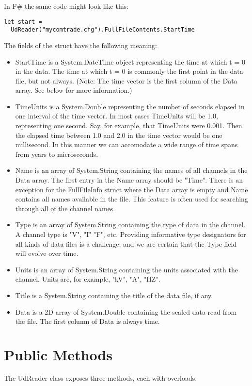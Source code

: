\documentclass[11pt,letterpaper,article]{memoir} %
\begin{document}
In F\# the same code might look like this:

\lstset{language=Caml}
\begin{lstlisting}
let start = 
  UdReader("mycomtrade.cfg").FullFileContents.StartTime
\end{lstlisting}

The fields of the struct have the following meaning:
\begin{itemize}
  \item StartTime is a System.DateTime object representing the time at which t = 0 in the data. The time at which t = 0 is commonly the first point in the data file, but not always. (Note: The time vector is the first column of the Data array. See below for more information.) 
  \item TimeUnits is a System.Double representing the number of seconds elapsed in one interval of the time vector. In most cases TimeUnits will be 1.0, representing one second. Say, for example, that TimeUnits were 0.001. Then the elapsed time between 1.0 and 2.0 in the time vector would be one millisecond. In this manner we can accomodate a wide range of time spans from years to microseconds.
  \item Name is an array of System.String containing the names of all channels in the Data array. The first entry in the Name array should be "Time". There is an exception for the FullFileInfo struct where the Data array is empty and Name contains all names available in the file. This feature is often used for searching through all of the channel names. 
  \item Type is an array of System.String containing the type of data in the channel. A channel type is "V", "I" "F", etc. Providing informative type designators for all kinds of data files is a challenge, and we are certain that the Type field will evolve over time.
  \item Units is an array of System.String containing the units associated with the channel. Units are, for example, "kV", "A", "HZ".
  \item Title is a System.String containing the title of the data file, if any.
  \item Data is a 2D array of System.Double containing the scaled data read from the file. The first column of Data is always time. 
\end{itemize}



\section{Public Methods}
The UdReader class exposes three methods, each with overloads. 
\end{document}
